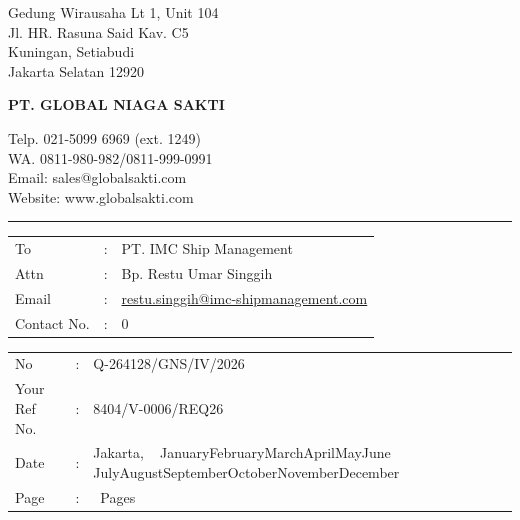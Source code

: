 \documentclass[9pt,a4paper,landscape]{article}
\newcommand{\MonthName}{%
  \ifcase\month\or January\or February\or March\or April\or May\or June\or
  July\or August\or September\or October\or November\or December\fi}
\newcommand{\TodayJakarta}{Jakarta, \the\day\ \MonthName\ \the\year}
\begin{document}
\thispagestyle{firstpage}

\noindent
\begin{minipage}[t]{0.28\textwidth}
  {\fontsize{7.5}{9.5}\selectfont
  Gedung Wirausaha Lt 1, Unit 104\\
  Jl. HR. Rasuna Said Kav. C5\\
  Kuningan, Setiabudi\\
  Jakarta Selatan 12920
  }
\end{minipage}%
\hfill
\begin{minipage}[t]{0.40\textwidth}
  \centering
  {\fontsize{22}{26}\selectfont\bfseries PT. GLOBAL NIAGA SAKTI}
\end{minipage}%
\hfill
\begin{minipage}[t]{0.28\textwidth}
  \raggedleft
  {\fontsize{7.5}{9.5}\selectfont
  Telp. 021-5099 6969 (ext. 1249)\\
  WA. 0811-980-982/0811-999-0991\\
  Email: sales@globalsakti.com\\
  Website: www.globalsakti.com
  }
\end{minipage}

\vspace{0.4cm}
\noindent\rule{\textwidth}{0.8pt}
\vspace{0.3cm}

\noindent
\begin{minipage}[t]{0.52\textwidth}
  {\small
  \begin{tabular}{@{}l@{\,}l@{\,}l@{}}
    To           & : & PT. IMC Ship Management \\[1pt]
    Attn         & : & Bp. Restu Umar Singgih \\[1pt]
    Email        & : & \href{mailto:restu.singgih@imc-shipmanagement.com}{restu.singgih@imc-shipmanagement.com} \\[1pt]
    Contact No.  & : & 0 \\
  \end{tabular}
  }
\end{minipage}%
\hfill
\begin{minipage}[t]{0.44\textwidth}
  \raggedleft
  {\small
  \begin{tabular}{@{}l@{\,}l@{\,}l@{}}
    No           & : & Q-264128/GNS/IV/2026 \\[1pt]
    Your Ref No. & : & 8404/V-0006/REQ26 \\[1pt]
    Date         & : & \TodayJakarta \\[1pt]
    Page         & : & \pageref{LastPage}~Pages \\
  \end{tabular}
  }
\end{minipage}
\end{document}
